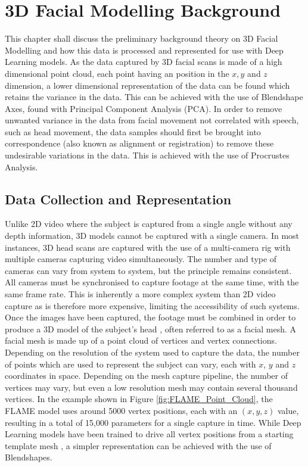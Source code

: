\chapter{3D Facial Modelling Background}

This chapter shall discuss the preliminary background theory on 3D Facial Modelling and how this data is processed and represented for use with Deep Learning models.
As the data captured by 3D facial scans is made of a high dimensional point cloud, each point having an position in the $x, y$ and $z$ dimension, a lower dimensional representation of the data can be found which retains the variance in the data.
This can be achieved with the use of Blendshape Axes, found with Principal Component Analysis (PCA).
In order to remove unwanted variance in the data from facial movement not correlated with speech, such as head movement, the data samples should first be brought into correspondence (also known as alignment or registration) to remove these undesirable variations in the data.
This is achieved with the use of Procrustes Analysis.

\section{Data Collection and Representation}
Unlike 2D video where the subject is captured from a single angle without any depth information, 3D models cannot be captured with a single camera.
In most instances, 3D head scans are captured with the use of a multi-camera rig with multiple cameras capturing video simultaneously.
The number and type of cameras can vary from system to system, but the principle remains consistent.
All cameras must be synchronised to capture footage at the same time, with the same frame rate.
This is inherently a more complex system than 2D video capture as is therefore more expensive, limiting the accessibility of such systems.  
Once the images have been captured, the footage must be combined in order to produce a 3D model of the subject's head \cite{Li2017}, often referred to as a facial mesh.
A facial mesh is made up of a point cloud of vertices and vertex connections.
Depending on the resolution of the system used to capture the data, the number of points which are used to represent the subject can vary, each with $x$, $y$ and $z$ coordinates in space.
Depending on the mesh capture pipeline, the number of vertices may vary, but even a low resolution mesh may contain several thousand vertices.
In the example shown in Figure \ref{fig:FLAME_Point_Cloud}, the FLAME model \cite{Li2017} uses around 5000 vertex positions, each with an $(x, y, z)$ value, resulting in a total of 15,000 parameters for a single capture in time.
While Deep Learning models have been trained to drive all vertex positions from a starting template mesh \cite{Karras2017a}, a simpler representation can be achieved with the use of Blendshapes.

